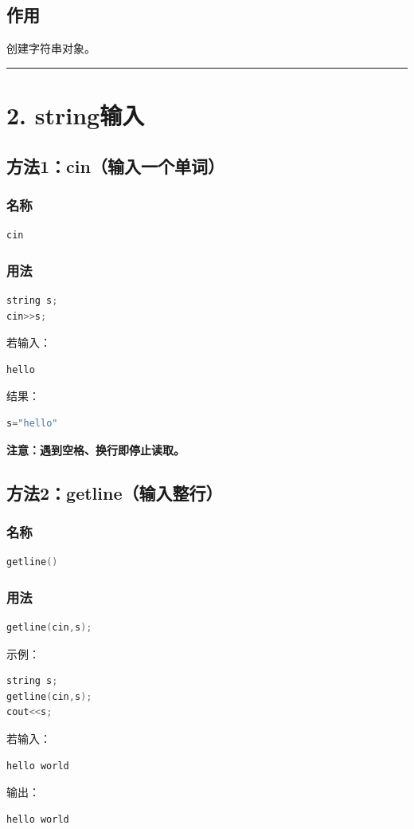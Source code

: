 \documentclass[10pt,twocolumn]{extarticle}
\begin{document}
\subsection{作用}
创建字符串对象。

\noindent\rule{\linewidth}{0.4pt}

\section{2. string输入}

\subsection{方法1：cin（输入一个单词）}
\subsubsection{名称}
\begin{lstlisting}[language=C++]
cin
\end{lstlisting}
\subsubsection{用法}
\begin{lstlisting}[language=C++]
string s;
cin>>s;
\end{lstlisting}
若输入：
\begin{lstlisting}
hello
\end{lstlisting}
结果：
\begin{lstlisting}[language=C++]
s="hello"
\end{lstlisting}
\textbf{注意：遇到空格、换行即停止读取。}

\subsection{方法2：getline（输入整行）}
\subsubsection{名称}
\begin{lstlisting}[language=C++]
getline()
\end{lstlisting}
\subsubsection{用法}
\begin{lstlisting}[language=C++]
getline(cin,s);
\end{lstlisting}
示例：
\begin{lstlisting}[language=C++]
string s;
getline(cin,s);
cout<<s;
\end{lstlisting}
若输入：
\begin{lstlisting}
hello world
\end{lstlisting}
输出：
\begin{lstlisting}
hello world
\end{lstlisting}
\end{document}
